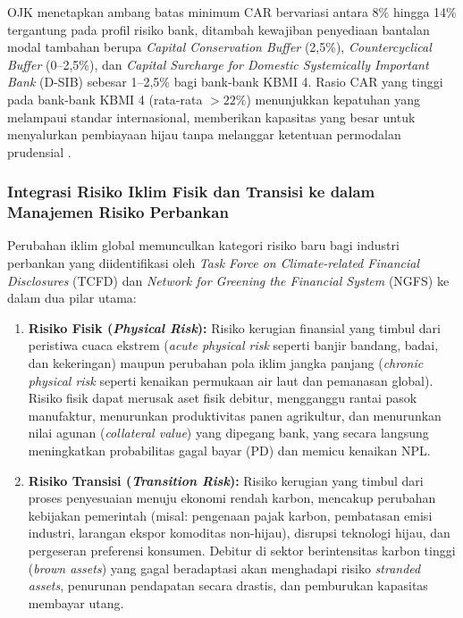 \documentclass[12pt,a4paper]{article}
\numberwithin{equation}{section}
\begin{document}
\noindent
OJK menetapkan ambang batas minimum CAR bervariasi antara 8\% hingga 14\% tergantung pada profil risiko bank, ditambah kewajiban penyediaan bantalan modal tambahan berupa \emph{Capital Conservation Buffer} (2,5\%), \emph{Countercyclical Buffer} (0--2,5\%), dan \emph{Capital Surcharge for Domestic Systemically Important Bank} (D-SIB) sebesar 1--2,5\% bagi bank-bank KBMI 4. Rasio CAR yang tinggi pada bank-bank KBMI 4 (rata-rata $>22\%$) menunjukkan kepatuhan yang melampaui standar internasional, memberikan kapasitas yang besar untuk menyalurkan pembiayaan hijau tanpa melanggar ketentuan permodalan prudensial \citep{BrighamEhrhardt2020, LestariPurnomo2023}.

\subsubsection{Integrasi Risiko Iklim Fisik dan Transisi ke dalam Manajemen Risiko Perbankan}
\noindent
Perubahan iklim global memunculkan kategori risiko baru bagi industri perbankan yang diidentifikasi oleh \emph{Task Force on Climate-related Financial Disclosures} (TCFD) dan \emph{Network for Greening the Financial System} (NGFS) ke dalam dua pilar utama:
\begin{enumerate}
  \item \textbf{Risiko Fisik (\emph{Physical Risk}):} Risiko kerugian finansial yang timbul dari peristiwa cuaca ekstrem (\emph{acute physical risk} seperti banjir bandang, badai, dan kekeringan) maupun perubahan pola iklim jangka panjang (\emph{chronic physical risk} seperti kenaikan permukaan air laut dan pemanasan global). Risiko fisik dapat merusak aset fisik debitur, mengganggu rantai pasok manufaktur, menurunkan produktivitas panen agrikultur, dan menurunkan nilai agunan (\emph{collateral value}) yang dipegang bank, yang secara langsung meningkatkan probabilitas gagal bayar ($\text{PD}$) dan memicu kenaikan NPL.
  \item \textbf{Risiko Transisi (\emph{Transition Risk}):} Risiko kerugian yang timbul dari proses penyesuaian menuju ekonomi rendah karbon, mencakup perubahan kebijakan pemerintah (misal: pengenaan pajak karbon, pembatasan emisi industri, larangan ekspor komoditas non-hijau), disrupsi teknologi hijau, dan pergeseran preferensi konsumen. Debitur di sektor berintensitas karbon tinggi (\emph{brown assets}) yang gagal beradaptasi akan menghadapi risiko \emph{stranded assets}, penurunan pendapatan secara drastis, dan pemburukan kapasitas membayar utang.
\end{enumerate}
\end{document}
